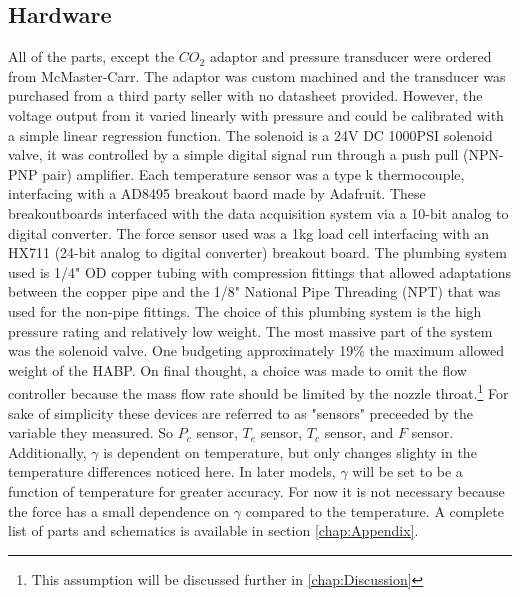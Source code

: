 \subsection{Hardware}
All of the parts, except the $CO_2$ adaptor and pressure transducer were ordered from McMaster-Carr. The adaptor was custom machined and the transducer was purchased from a third party seller with no datasheet provided. However, the voltage output from it varied linearly with pressure and could be calibrated with a simple linear regression function. The solenoid is a 24V DC 1000PSI solenoid valve, it was controlled by a simple digital signal run through a push pull (NPN-PNP pair) amplifier. Each temperature sensor was a type k thermocouple, interfacing with a AD8495 breakout baord made by Adafruit. These breakoutboards interfaced with the data acquisition system via a 10-bit analog to digital converter. The force sensor used was a 1kg load cell interfacing with an HX711 (24-bit analog to digital converter) breakout board. The plumbing system used is 1/4" OD copper tubing with compression fittings that allowed adaptations between the copper pipe and the 1/8" National Pipe Threading (NPT) that was used for the non-pipe fittings. The choice of this plumbing system is the high pressure rating and relatively low weight. The most massive part of the system was the solenoid valve. One budgeting approximately 19\% the maximum allowed weight of the HABP. On final thought, a choice was made to omit the flow controller because the mass flow rate should be limited by the nozzle throat.\footnote{This assumption will be discussed further in \ref{chap:Discussion}} For sake of simplicity these devices are referred to as "sensors" preceeded by the variable they measured. So $P_c$ sensor, $T_e$ sensor, $T_c$ sensor, and $F$ sensor. Additionally, $\gamma$ is dependent on temperature, but only changes slighty in the temperature differences noticed here. In later models, $\gamma$ will be set to be a function of temperature for greater accuracy. For now it is not necessary because the force has a small dependence on $\gamma$ compared to the temperature. A complete list of parts and schematics is available in section \ref{chap:Appendix}.

